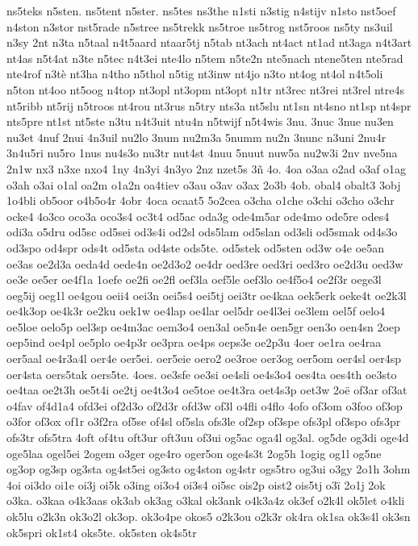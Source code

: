 {ns5teks
n5sten.
ns5tent
n5ster.
ns5tes
ns3the
n1sti
n3stig
n4stijv
n1sto
nst5oef
n4ston
n3stor
nst5rade
n5stree
ns5trekk
ns5troe
ns5trog
nst5roos
ns5ty
ns3uil
n3sy
2nt
n3ta
n5taal
n4t5aard
ntaar5tj
n5tab
nt3ach
nt4act
nt1ad
nt3aga
n4t3art
nt4as
n5t4at
n3te
n5tec
n4t3ei
nte4lo
n5tem
n5te2n
nte5nach
ntene5ten
nte5rad
nte4rof
n3tè
nt3ha
n4tho
n5thol
n5tig
nt3inw
nt4jo
n3to
nt4og
nt4ol
n4t5oli
n5ton
nt4oo
nt5oog
n4top
nt3opl
nt3opm
nt3opt
n1tr
nt3rec
nt3rei
nt3rel
ntre4s
nt5ribb
nt5rij
n5troos
nt4rou
nt3rus
n5try
nts3a
nt5slu
nt1sn
nt4sno
nt1sp
nt4spr
nts5pre
nt1st
nt5ste
n3tu
n4t3uit
ntu4n
n5twijf
n5t4wis
3nu.
3nuc
3nue
nu3en
nu3et
4nuf
2nui
4n3uil
nu2lo
3num
nu2m3a
5numm
nu2n
3nunc
n3uni
2nu4r
3n4u5ri
nu5ro
1nus
nu4s3o
nu3tr
nut4st
4nuu
5nuut
nuw5a
nu2w3i
2nv
nve5na
2n1w
nx3
n3xe
nxo4
1ny
4n3yi
4n3yo
2nz
nzet5s
3ñ
4o.
4oa
o3aa
o2ad
o3af
o1ag
o3ah
o3ai
o1al
oa2m
o1a2n
oa4tiev
o3au
o3av
o3ax
2o3b
4ob.
obal4
obalt3
3obj
1o4bli
ob5oor
o4b5o4r
4obr
4oca
ocaat5
5o2cea
o3cha
o1che
o3chi
o3cho
o3chr
ocke4
4o3co
oco3a
oco3s4
oc3t4
od5ac
oda3g
ode4m5ar
ode4mo
ode5re
odes4
odi3a
o5dru
od5sc
od5sei
od3s4i
od2sl
ods5lam
od5slan
od3sli
od5smak
od4s3o
od3spo
od4spr
ods4t
od5sta
od4ste
ods5te.
od5stek
od5sten
od3w
o4e
oe5an
oe3as
oe2d3a
oeda4d
oede4n
oe2d3o2
oe4dr
oed3re
oed3ri
oed3ro
oe2d3u
oed3w
oe3e
oe5er
oe4f1a
1oefe
oe2fi
oe2fl
oef3la
oef5le
oef3lo
oe4f5o4
oe2f3r
oege3l
oeg5ij
oeg1l
oe4gou
oeii4
oei3n
oei5s4
oei5tj
oei3tr
oe4kaa
oek5erk
oeke4t
oe2k3l
oe4k3op
oe4k3r
oe2ku
oek1w
oe4lap
oe4lar
oel5dr
oe4l3ei
oe3lem
oel5f
oelo4
oe5loe
oelo5p
oel3sp
oe4m3ac
oem3o4
oen3al
oe5n4e
oen5gr
oen3o
oen4sn
2oep
oep5ind
oe4pl
oe5plo
oe4p3r
oe3pra
oe4ps
oeps3e
oe2p3u
4oer
oe1ra
oe4raa
oer5aal
oe4r3a4l
oer4e
oer5ei.
oer5eie
oero2
oe3roe
oer3og
oer5om
oer4sl
oer4sp
oer4sta
oers5tak
oers5te.
4oes.
oe3sfe
oe3si
oe4sli
oe4s3o4
oes4ta
oes4th
oe3sto
oe4taa
oe2t3h
oe5t4i
oe2tj
oe4t3o4
oe5toe
oe4t3ra
oet4s3p
oet3w
2oë
of3ar
of3at
o4fav
of4d1a4
ofd3ei
of2d3o
of2d3r
ofd3w
of3l
o4fli
o4flo
4ofo
of3om
o3foo
of3op
o3for
of3ox
of1r
o3f2ra
of5se
of4sl
of5sla
ofs3le
of2sp
of3spe
ofs3pl
of3spo
ofs3pr
ofs3tr
ofs5tra
4oft
of4tu
oft3ur
oft3uu
of3ui
og5ac
oga4l
og3al.
og5de
og3di
oge4d
oge5laa
ogel5ei
2ogem
o3ger
oge4ro
oger5on
oge4s3t
2og5h
1ogig
og1l
og5ne
og3op
og3sp
og3sta
og4st5ei
og3sto
og4ston
og4str
ogs5tro
og3ui
o3gy
2o1h
3ohm
4oi
oi3do
oi1e
oi3j
oi5k
o3ing
oi3o4
oi3s4
oi5sc
ois2p
oist2
ois5tj
o3ï
2o1j
2ok
o3ka.
o3kaa
o4k3aas
ok3ab
ok3ag
o3kal
ok3ank
o4k3a4z
ok3ef
o2k4l
ok5let
o4kli
ok5lu
o2k3n
ok3o2l
ok3op.
ok3o4pe
okos5
o2k3ou
o2k3r
ok4ra
ok1sa
ok3s4l
ok3sn
ok5spri
ok1st4
oks5te.
ok5sten
ok4s5tr
}
